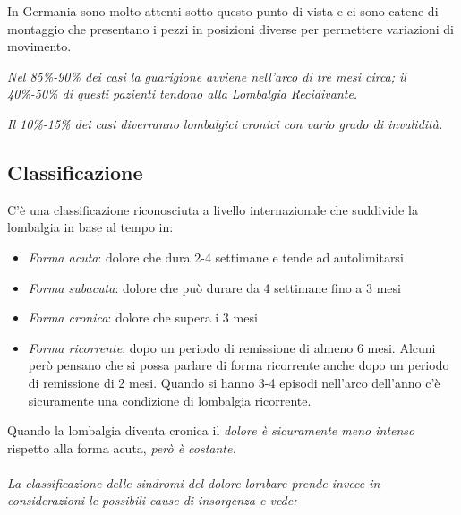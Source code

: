 In Germania sono molto attenti sotto questo punto di vista e ci sono
catene di montaggio che presentano i pezzi in posizioni diverse per
permettere variazioni di movimento.

\emph{Nel 85\%-90\% dei casi la guarigione avviene nell'arco di tre mesi
circa; il 40\%-50\% di questi pazienti tendono alla Lombalgia
Recidivante. }

\emph{Il 10\%-15\% dei casi diverranno lombalgici cronici con vario
grado di invalidità.}

\subsection{Classificazione}


C'è una classificazione riconosciuta a livello internazionale che
suddivide la lombalgia in base al tempo in:

\begin{itemize}
\item
   
  \emph{Forma acuta}: dolore che dura 2-4 settimane e tende ad
  autolimitarsi

\item
   
  \emph{Forma subacuta}: dolore che può durare da 4 settimane fino a 3
  mesi

\item
   
  \emph{Forma cronica}: dolore che supera i 3 mesi

\item
   
  \emph{Forma ricorrente}: dopo un periodo di remissione di almeno 6
  mesi. Alcuni però pensano che si possa parlare di forma ricorrente
  anche dopo un periodo di remissione di 2 mesi. Quando si hanno 3-4
  episodi nell'arco dell'anno c'è sicuramente una condizione di
  lombalgia ricorrente.
   
\end{itemize}

Quando la lombalgia diventa cronica il \emph{dolore è sicuramente meno
intenso} rispetto alla forma acuta, \emph{però è costante.}
\\\\
\emph{La classificazione delle sindromi del dolore lombare prende invece
in considerazioni le possibili cause di insorgenza e vede:}

